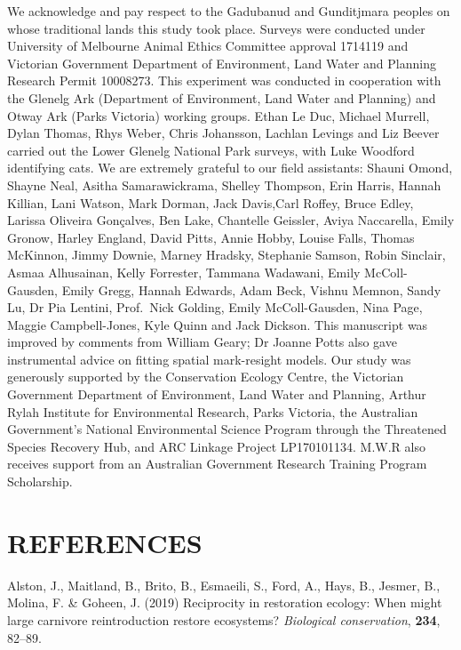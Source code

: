 \documentclass[]{elsarticle} %
\begin{document}
We acknowledge and pay respect to the Gadubanud and Gunditjmara peoples on whose traditional lands this study took place. Surveys were conducted under University of Melbourne Animal Ethics Committee approval 1714119 and Victorian Government Department of Environment, Land Water and Planning Research Permit 10008273. This experiment was conducted in cooperation with the Glenelg Ark (Department of Environment, Land Water and Planning) and Otway Ark (Parks Victoria) working groups. Ethan Le Duc, Michael Murrell, Dylan Thomas, Rhys Weber, Chris Johansson, Lachlan Levings and Liz Beever carried out the Lower Glenelg National Park surveys, with Luke Woodford identifying cats. We are extremely grateful to our field assistants: Shauni Omond, Shayne Neal, Asitha Samarawickrama, Shelley Thompson, Erin Harris, Hannah Killian, Lani Watson, Mark Dorman, Jack Davis,Carl Roffey, Bruce Edley, Larissa Oliveira Gonçalves, Ben Lake, Chantelle Geissler, Aviya Naccarella, Emily Gronow, Harley England, David Pitts, Annie Hobby, Louise Falls, Thomas McKinnon, Jimmy Downie, Marney Hradsky, Stephanie Samson, Robin Sinclair, Asmaa Alhusainan, Kelly Forrester, Tammana Wadawani, Emily McColl-Gausden, Emily Gregg, Hannah Edwards, Adam Beck, Vishnu Memnon, Sandy Lu, Dr Pia Lentini, Prof.~Nick Golding, Emily McColl-Gausden, Nina Page, Maggie Campbell-Jones, Kyle Quinn and Jack Dickson. This manuscript was improved by comments from William Geary; Dr Joanne Potts also gave instrumental advice on fitting spatial mark-resight models. Our study was generously supported by the Conservation Ecology Centre, the Victorian Government Department of Environment, Land Water and Planning, Arthur Rylah Institute for Environmental Research, Parks Victoria, the Australian Government's National Environmental Science Program through the Threatened Species Recovery Hub, and ARC Linkage Project LP170101134. M.W.R also receives support from an Australian Government Research Training Program Scholarship.

\newpage

\hypertarget{references}{%
\section*{REFERENCES}\label{references}}

\hypertarget{refs}{}
\leavevmode\hypertarget{ref-alston2019reciprocity}{}%
Alston, J., Maitland, B., Brito, B., Esmaeili, S., Ford, A., Hays, B., Jesmer, B., Molina, F. \& Goheen, J. (2019) Reciprocity in restoration ecology: When might large carnivore reintroduction restore ecosystems? \emph{Biological conservation}, \textbf{234}, 82--89.
\end{document}
